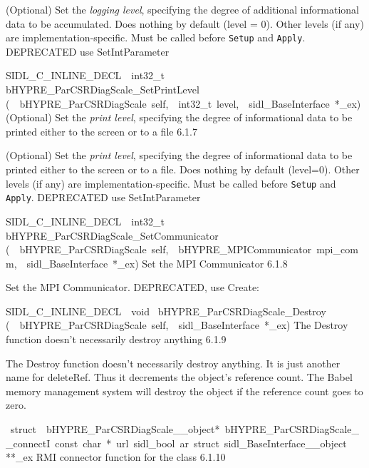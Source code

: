 \documentclass{article}
\begin{document}
\begin{cxxentry}
\begin{cxxentry}
\begin{cxxfunction}
\begin{cxxdoc}
(Optional) Set the {\it logging level}, specifying the degree
of additional informational data to be accumulated.  Does
nothing by default (level = 0).  Other levels (if any) are
implementation-specific.  Must be called before {\tt Setup}
and {\tt Apply}.
DEPRECATED   use SetIntParameter
\end{cxxdoc}
\end{cxxfunction}
\begin{cxxfunction}
{SIDL\_C\_INLINE\_DECL\ \ int32\_t\ }
        {bHYPRE\_ParCSRDiagScale\_SetPrintLevel}
        {(\ \ bHYPRE\_ParCSRDiagScale\ self,\ \ int32\_t\ level,\ \ sidl\_BaseInterface\ *\_ex)}
        {
(Optional) Set the {\it print level}, specifying the degree
of informational data to be printed either to the screen or
to a file}
        {6.1.7}
\begin{cxxdoc}

(Optional) Set the {\it print level}, specifying the degree
of informational data to be printed either to the screen or
to a file.  Does nothing by default (level=0).  Other levels
(if any) are implementation-specific.  Must be called before
{\tt Setup} and {\tt Apply}.
DEPRECATED   use SetIntParameter
\end{cxxdoc}
\end{cxxfunction}
\begin{cxxfunction}
{SIDL\_C\_INLINE\_DECL\ \ int32\_t\ }
        {bHYPRE\_ParCSRDiagScale\_SetCommunicator}
        {(\ \ bHYPRE\_ParCSRDiagScale\ self,\ \ bHYPRE\_MPICommunicator\ mpi\_comm,\ \ sidl\_BaseInterface\ *\_ex)}
        {
Set the MPI Communicator}
        {6.1.8}
\begin{cxxdoc}

Set the MPI Communicator.
DEPRECATED, use Create:
\end{cxxdoc}
\end{cxxfunction}
\begin{cxxfunction}
{SIDL\_C\_INLINE\_DECL\ \ void\ }
        {bHYPRE\_ParCSRDiagScale\_Destroy}
        {(\ \ bHYPRE\_ParCSRDiagScale\ self,\ \ sidl\_BaseInterface\ *\_ex)}
        {
The Destroy function doesn't necessarily destroy anything}
        {6.1.9}
\begin{cxxdoc}

The Destroy function doesn't necessarily destroy anything.
It is just another name for deleteRef.  Thus it decrements the
object's reference count.  The Babel memory management system will
destroy the object if the reference count goes to zero.
\end{cxxdoc}
\end{cxxfunction}
\begin{cxxvariable}
{\ struct\ \ bHYPRE\_ParCSRDiagScale\_\_object*\ bHYPRE\_ParCSRDiagScale\_\_connectI\ const\ char\ *\ url\ sidl\_bool\ ar\ struct\ sidl\_BaseInterface\_\_object}
        {**\_ex}
        {}
        {
RMI connector function for the class}
        {6.1.10}
\begin{cxxdoc}


\end{cxxdoc}
\end{cxxvariable}
\end{cxxentry}
\end{cxxentry}
\end{document}
